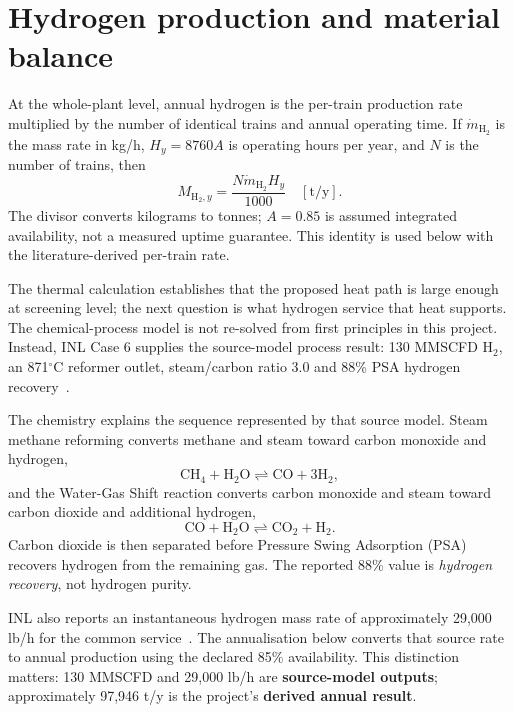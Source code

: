 \section{Hydrogen production and material balance}\label{sec:hydrogen}
At the whole-plant level, annual hydrogen is the per-train production rate multiplied by the number of identical trains and annual operating time. If $\dot m_{\mathrm{H_2}}$ is the mass rate in kg/h, $H_y=8760A$ is operating hours per year, and $N$ is the number of trains, then
\[
M_{\mathrm{H_2},y}=\frac{N\dot m_{\mathrm{H_2}}H_y}{1000}
\quad[\mathrm{t/y}].
\]
The divisor converts kilograms to tonnes; $A=0.85$ is assumed integrated availability, not a measured uptime guarantee. This identity is used below with the literature-derived per-train rate.

The thermal calculation establishes that the proposed heat path is large enough at screening level; the next question is what hydrogen service that heat supports. The chemical-process model is not re-solved from first principles in this project. Instead, INL Case 6 supplies the source-model process result: 130 MMSCFD H$_2$, an 871$^\circ$C reformer outlet, steam/carbon ratio 3.0 and 88\% PSA hydrogen recovery~\cite{inltev953,inltev961}.

The chemistry explains the sequence represented by that source model. Steam methane reforming converts methane and steam toward carbon monoxide and hydrogen,
\[
\mathrm{CH_4+H_2O\rightleftharpoons CO+3H_2},
\]
and the Water-Gas Shift reaction converts carbon monoxide and steam toward carbon dioxide and additional hydrogen,
\[
\mathrm{CO+H_2O\rightleftharpoons CO_2+H_2}.
\]
Carbon dioxide is then separated before Pressure Swing Adsorption (PSA) recovers hydrogen from the remaining gas. The reported 88\% value is \emph{hydrogen recovery}, not hydrogen purity.

INL also reports an instantaneous hydrogen mass rate of approximately 29,000 lb/h for the common service~\cite{inltev953,inltev961}. The annualisation below converts that source rate to annual production using the declared 85\% availability. This distinction matters: 130 MMSCFD and 29,000 lb/h are \textbf{source-model outputs}; approximately 97,946 t/y is the project's \textbf{derived annual result}.


